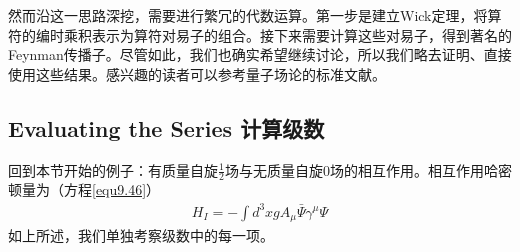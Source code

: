 然而沿这一思路深挖，需要进行繁冗的代数运算。第一步是建立Wick定理，将算符的编时乘积表示为算符对易子的组合。接下来需要计算这些对易子，得到著名的Feynman传播子。尽管如此，我们也确实希望继续讨论，所以我们略去证明、直接使用这些结果。感兴趣的读者可以参考量子场论的标准文献。

\subsection{Evaluating the Series 计算级数}\label{sec{9.5.4}}
回到本节开始的例子：有质量自旋$\frac{1}{2}$场与无质量自旋$0$场的相互作用。相互作用哈密顿量为（方程\ref{equ9.46}）
\begin{gather*}
H_I=-\int d^3x g A_\mu\bar{\Psi}\gamma^\mu\Psi
\end{gather*}
如上所述，我们单独考察级数中的每一项。

